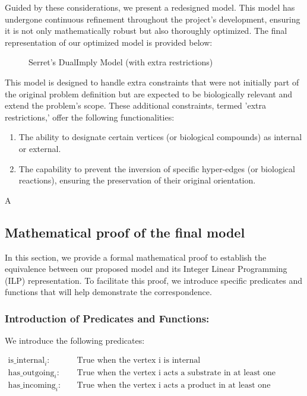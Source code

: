Guided by these considerations, we present a redesigned model. This model has undergone continuous refinement throughout the project's development, ensuring it is not only mathematically robust but also thoroughly optimized. The final representation of our optimized model is provided below:

\begin{figure}[H]
    \centering
    \caption{Serret's DualImply Model (with extra restrictions)}
    \label{fig:zephyr}
\end{figure}

This model is designed to handle extra constraints that were not initially part of the original problem definition but are expected to be biologically relevant and extend the problem's scope. These additional constraints, termed 'extra restrictions,' offer the following functionalities:

\begin{enumerate}
    \item The ability to designate certain vertices (or biological compounds) as internal or external.

    \item The capability to prevent the inversion of specific hyper-edges (or biological reactions), ensuring the preservation of their original orientation.
\end{enumerate}

A
    
    
\subsection{Mathematical proof of the final model} \label{sec:math_proof}

In this section, we provide a formal mathematical proof to establish the equivalence between our proposed model and its Integer Linear Programming (ILP) representation. To facilitate this proof, we introduce specific predicates and functions that will help demonstrate the correspondence.

\subsubsection{Introduction of Predicates and Functions:}

We introduce the following predicates:
    
\begin{align*}
    \text{is\_internal}_{i} : \quad&\text{True when the vertex i is internal}\\
    \text{has\_outgoing}_{i} : \quad&\text{True when the vertex i acts a substrate in at least one hyperedge} \\
    \text{has\_incoming}_{i} : \quad&\text{True when the vertex i acts a product in at least one hyperedge} \\
\end{align*}


